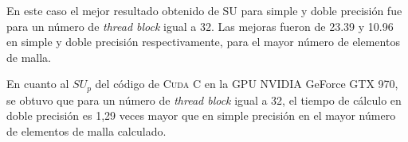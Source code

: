 En este caso el mejor resultado obtenido de SU para simple y doble precisión fue para un número de  \textit{thread block} igual a 32. Las mejoras fueron de 23.39 y 10.96 en simple y doble precisión respectivamente, para el mayor número de elementos de malla. 

En cuanto al $SU_p$ del código de \textsc{Cuda C} en la GPU NVIDIA GeForce GTX 970, se obtuvo que para un número de \textit{thread block} igual a 32, el tiempo de cálculo en doble precisión es 1,29 veces mayor que en simple precisión en el mayor número de elementos de malla calculado. 


